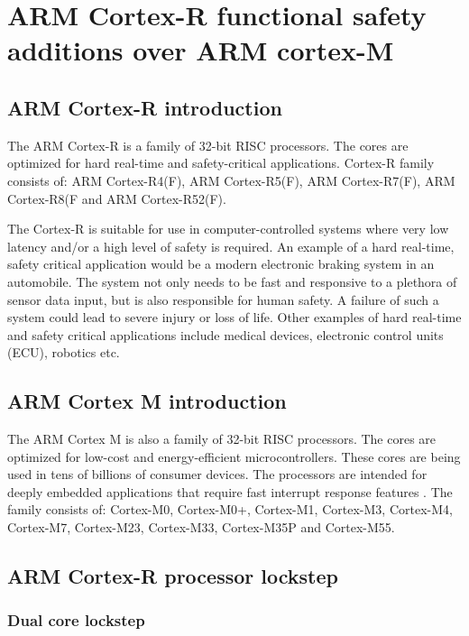 \chapter{ARM Cortex-R functional safety additions over ARM cortex-M}
\label{cortex_r_additions}

\section{ARM Cortex-R introduction}

The ARM Cortex-R is a family of 32-bit RISC processors. The cores are optimized for hard real-time and safety-critical applications. Cortex-R family consists of: ARM Cortex-R4(F), ARM Cortex-R5(F), ARM Cortex-R7(F), ARM Cortex-R8(F and ARM Cortex-R52(F).

The Cortex-R is suitable for use in computer-controlled systems where very low latency and/or a high level of safety is required. An example of a hard real-time, safety critical application would be a modern electronic braking system in an automobile. The system not only needs to be fast and responsive to a plethora of sensor data input, but is also responsible for human safety. A failure of such a system could lead to severe injury or loss of life. Other examples of hard real-time and safety critical applications include medical devices, electronic control units (ECU), robotics etc.

\section{ARM Cortex M introduction}

The ARM Cortex M is also a family of 32-bit RISC processors. The cores are optimized for low-cost and energy-efficient microcontrollers. These cores are being used in tens of billions of consumer devices. The processors are intended for deeply embedded applications that require fast interrupt response features \citep{cortex_m4_reference}. The family consists of: Cortex-M0, Cortex-M0+, Cortex-M1, Cortex-M3, Cortex-M4, Cortex-M7, Cortex-M23, Cortex-M33, Cortex-M35P and Cortex-M55.


\section{ARM Cortex-R processor lockstep}


\subsection{Dual core lockstep}

